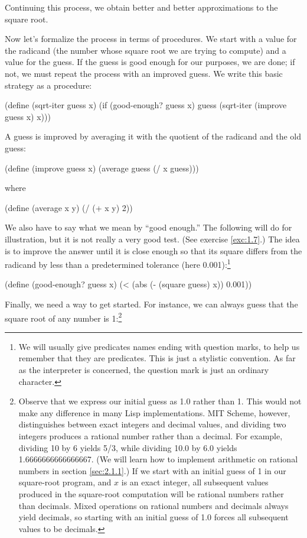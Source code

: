 \begin{schemedisplay}
Continuing this process, we obtain better and better
approximations to the square root.

Now let's formalize the process in terms of procedures.  We start with
a value for the radicand (the number whose square root we are trying
to compute) and a value for the guess.  If the guess is good enough
for our purposes, we are done; if not, we must repeat the process with an
improved guess.  We write this basic strategy as a procedure:

\begin{schemedisplay}
(define (sqrt-iter guess x)
  (if (good-enough? guess x)
      guess
      (sqrt-iter (improve guess x)
                 x)))
\end{schemedisplay}

A guess is improved by averaging
it with the quotient of the radicand and the old guess:

\begin{schemedisplay}
(define (improve guess x)
  (average guess (/ x guess)))
\end{schemedisplay}

\noindent where

\begin{schemedisplay}
(define (average x y)
  (/ (+ x y) 2))
\end{schemedisplay}

We also have to say what we mean by ``good enough.''  The following
will do for illustration, but it is not really a very good test.  (See
exercise \ref{exc:1.7}.)  The idea is to improve the answer until it
is close enough so that its square differs from the radicand by less
than a predetermined tolerance (here 0.001):\footnote{We will usually
  give predicates names ending with question marks, to help us
  remember that they are predicates.  This is just a stylistic
  convention.  As far as the interpreter is concerned, the question
  mark is just an ordinary character.}

\begin{schemedisplay}
(define (good-enough? guess x)
  (< (abs (- (square guess) x)) 0.001))
\end{schemedisplay}

Finally, we need a way to get started.  For instance, we can always
guess that the square root of any number is 1:\footnote{Observe that
  we express our initial guess as 1.0 rather than 1.  This would not
  make any difference in many Lisp implementations. MIT Scheme,
  however, distinguishes between exact integers and decimal values,
  and dividing two integers produces a rational number rather than a
  decimal.  For example, dividing 10 by 6 yields 5/3, while dividing
  10.0 by 6.0 yields 1.6666666666666667.  (We will learn how to
  implement arithmetic on rational numbers in section
  \ref{sec:2.1.1}.)  If we start with an initial guess of 1 in our
  square-root program, and $x$ is an exact integer, all subsequent
  values produced in the square-root computation will be rational
  numbers rather than decimals.  Mixed operations on rational numbers
  and decimals always yield decimals, so starting with an initial
  guess of 1.0 forces all subsequent values to be decimals.}


\end{schemedisplay}
